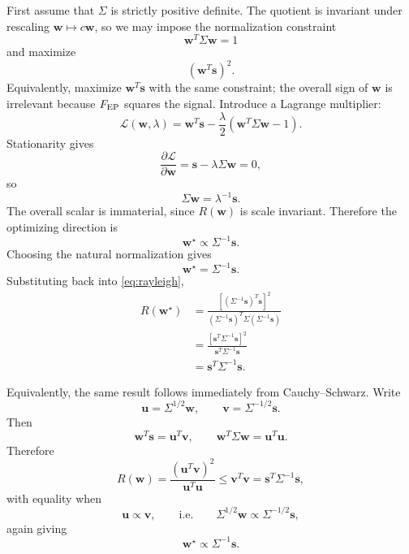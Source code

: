 \documentclass[11pt]{article}
\newcommand{\FEP}{F_{\rm EP}}
\begin{document}
First assume that $\Sigma$ is strictly positive definite.  The quotient
is invariant under rescaling $\bm w\mapsto c\bm w$, so we may impose the
normalization constraint
\[
  \bm w^T\Sigma\bm w=1
\]
and maximize
\[
  (\bm w^T\bm s)^2.
\]
Equivalently, maximize $\bm w^T\bm s$ with the same constraint; the
overall sign of $\bm w$ is irrelevant because $\FEP$ squares the signal.
Introduce a Lagrange multiplier:
\begin{equation}
  \mathcal L(\bm w,\lambda)
  =
  \bm w^T\bm s
  -
  \frac{\lambda}{2}
  \left(
    \bm w^T\Sigma\bm w-1
  \right).
\end{equation}
Stationarity gives
\begin{equation}
  \frac{\partial\mathcal L}{\partial\bm w}
  =
  \bm s-\lambda\Sigma\bm w
  =
  0,
\end{equation}
so
\begin{equation}
  \Sigma\bm w
  =
  \lambda^{-1}\bm s.
\end{equation}
The overall scalar is immaterial, since $R(\bm w)$ is scale invariant.
Therefore the optimizing direction is
\begin{equation}
  \bm w^\star \propto \Sigma^{-1}\bm s.
\end{equation}
Choosing the natural normalization gives
\begin{equation}
  \bm w^\star=\Sigma^{-1}\bm s.
\end{equation}
Substituting back into \eqref{eq:rayleigh},
\begin{align}
  R(\bm w^\star)
  &=
  \frac{
    \left[
      (\Sigma^{-1}\bm s)^T\bm s
    \right]^2
  }{
    (\Sigma^{-1}\bm s)^T\Sigma(\Sigma^{-1}\bm s)
  } \\
  &=
  \frac{
    \left[
      \bm s^T\Sigma^{-1}\bm s
    \right]^2
  }{
    \bm s^T\Sigma^{-1}\bm s
  } \\
  &=
  \bm s^T\Sigma^{-1}\bm s.
\end{align}

Equivalently, the same result follows immediately from
Cauchy--Schwarz.  Write
\[
  \bm u=\Sigma^{1/2}\bm w,
  \qquad
  \bm v=\Sigma^{-1/2}\bm s.
\]
Then
\[
  \bm w^T\bm s
  =
  \bm u^T\bm v,
  \qquad
  \bm w^T\Sigma\bm w
  =
  \bm u^T\bm u.
\]
Therefore
\begin{equation}
  R(\bm w)
  =
  \frac{(\bm u^T\bm v)^2}{\bm u^T\bm u}
  \le
  \bm v^T\bm v
  =
  \bm s^T\Sigma^{-1}\bm s,
\end{equation}
with equality when
\[
  \bm u\propto \bm v,
  \qquad\text{i.e.}\qquad
  \Sigma^{1/2}\bm w
  \propto
  \Sigma^{-1/2}\bm s,
\]
again giving
\[
  \bm w^\star\propto\Sigma^{-1}\bm s.
\]
\end{document}
